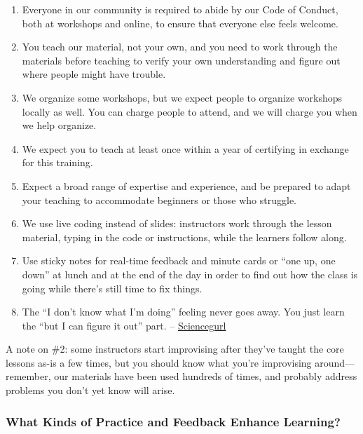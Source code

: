 \begin{enumerate}
\item
  Everyone in our community is required to abide by our
  Code of Conduct, both
  at workshops and online, to ensure that everyone else feels welcome.
\item
  You teach our material, not your own, and you need to work through the
  materials before teaching to verify your own understanding and figure
  out where people might have trouble.
\item
  We organize some workshops, but we expect people to organize workshops
  locally as well. You can charge people to attend, and we will charge
  you when we help organize.
\item
  We expect you to teach at least once within a year of certifying in
  exchange for this training.
\item
  Expect a broad range of expertise and experience, and be prepared to
  adapt your teaching to accommodate beginners or those who struggle.
\item
  We use live coding instead of slides: instructors work through the
  lesson material, typing in the code or instructions, while the
  learners follow along.
\item
  Use sticky notes for real-time feedback and minute cards or ``one up,
  one down'' at lunch and at the end of the day in order to find out how
  the class is going while there's still time to fix things.
\item
  The ``I don't know what I'm doing'' feeling never goes away. You just
  learn the ``but I can figure it out'' part. --
  \href{https://twitter.com/sciencegurlz0/status/687739023826235393}{Sciencegurl}
\end{enumerate}

A note on \#2: some instructors start improvising after they've taught
the core lessons as-is a few times, but you should know what you're
improvising around---remember, our materials have been used hundreds of
times, and probably address problems you don't yet know will arise.

\subsubsection{What Kinds of Practice and Feedback Enhance
Learning?}\label{what-kinds-of-practice-and-feedback-enhance-learning}

